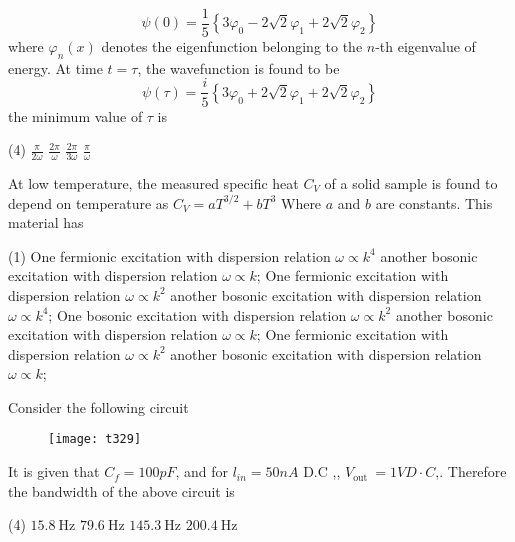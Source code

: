 \begin{questions}
\begin{minipage}{\textwidth}
	$$
	\psi(0)=\frac{1}{5}\left\{3 \varphi_{0}-2 \sqrt{2} \varphi_{1}+2 \sqrt{2} \varphi_{2}\right\}
	$$
	where $\varphi_{n}(x)$ denotes the eigenfunction belonging to the $n$-th eigenvalue of energy. At time $t=\tau$, the wavefunction is found to be
	$$
	\psi(\tau)=\frac{i}{5}\left\{3 \varphi_{0}+2 \sqrt{2} \varphi_{1}+2 \sqrt{2} \varphi_{2}\right\}
	$$
	the minimum value of $\tau$ is
\end{minipage}
\begin{tasks}(4)
	\task[\textbf{A.}] $\frac{\pi}{2 \omega}$
	\task[\textbf{B.}] $\frac{2 \pi}{\omega}$
	\task[\textbf{C.}] $\frac{2 \pi}{3 \omega}$
	\task[\textbf{D.}]   $\frac{\pi}{\omega}$
\end{tasks}
\begin{minipage}{\textwidth}
	\question At low temperature, the measured specific heat $C_{V}$ of a solid sample is found to depend on temperature as $C_{V}=a T^{3 / 2}+b T^{3}$
	Where $a$ and $b$ are constants. This material has
\end{minipage}
\begin{tasks}(1)
	\task[\textbf{A.}] One fermionic excitation with dispersion relation $\omega \propto k^{4}$ another bosonic excitation with dispersion relation $\omega \propto k$;
	\task[\textbf{B.}] One fermionic excitation with dispersion relation $\omega \propto k^{2}$ another bosonic excitation with dispersion relation $\omega \propto k^{4}$;
	\task[\textbf{C.}] One bosonic excitation with dispersion relation $\omega \propto k^{2}$ another bosonic excitation with dispersion relation $\omega \propto k$;
	\task[\textbf{D.}] One fermionic excitation with dispersion relation $\omega \propto k^{2}$ another bosonic excitation with dispersion relation $\omega \propto k$;
\end{tasks}
\begin{minipage}{\textwidth}
	\question Consider the following circuit\\
	\begin{figure}[H]
		\centering
		\texttt{[image: t329]}
	\end{figure}
	It is given that $C_{f}=100 p F$, and for $l_{i n}=50 n A$   D.C ,, $V_{\text {out }}=1 V D \cdot C$,. Therefore the bandwidth of the above circuit is
\end{minipage}
\begin{tasks}(4)
	\task[\textbf{A.}]   $15.8 \mathrm{~Hz}$
	\task[\textbf{B.}] $79.6 \mathrm{~Hz}$
	\task[\textbf{C.}] $145.3 \mathrm{~Hz}$
	\task[\textbf{D.}] $200.4 \mathrm{~Hz}$

\end{tasks}
\end{questions}
